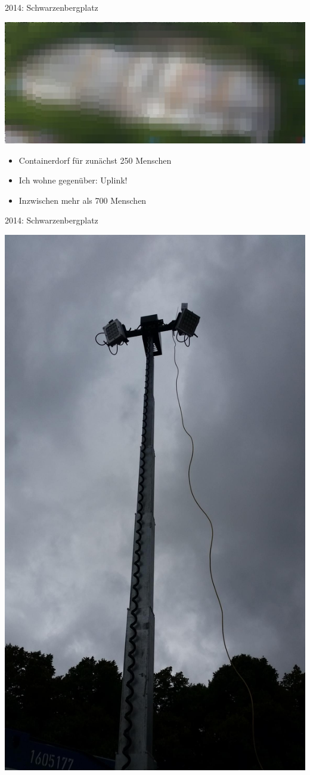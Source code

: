 \documentclass[t]{beamer}
\begin{document}
  \begin{frame}{2014: Schwarzenbergplatz}
    \begin{center}
      \includegraphics[width=.8\textwidth]{Bilder/schwarzenberg}
    \end{center}
    \begin{itemize}
      \item Containerdorf für zunächst 250 Menschen
      \item Ich wohne gegenüber: Uplink!
      \item Inzwischen mehr als 700 Menschen
    \end{itemize}
  \end{frame}
  
  \begin{frame}{2014: Schwarzenbergplatz}
    \begin{center}
      \includegraphics[width=.4\textwidth]{Bilder/schwarzenberg-lichtmast}
    \end{center}
  \end{frame}
  
\end{document}
